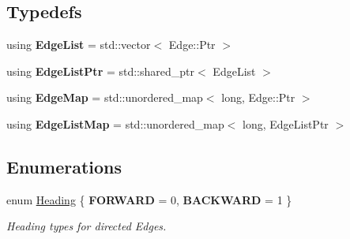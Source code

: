 \subsection*{Typedefs}
\begin{DoxyCompactItemize}
\item 
using {\bfseries Edge\+List} = std\+::vector$<$ Edge\+::\+Ptr $>$\hypertarget{namespacegeo_a4954bc71befa4d36c9f01bc1bdcfa4a9}{}\label{namespacegeo_a4954bc71befa4d36c9f01bc1bdcfa4a9}

\item 
using {\bfseries Edge\+List\+Ptr} = std\+::shared\+\_\+ptr$<$ Edge\+List $>$\hypertarget{namespacegeo_a840e1425ec1f0ce5bee8007cd8d8e31f}{}\label{namespacegeo_a840e1425ec1f0ce5bee8007cd8d8e31f}

\item 
using {\bfseries Edge\+Map} = std\+::unordered\+\_\+map$<$ long, Edge\+::\+Ptr $>$\hypertarget{namespacegeo_ad4965f9d39034484ea50d791836b82de}{}\label{namespacegeo_ad4965f9d39034484ea50d791836b82de}

\item 
using {\bfseries Edge\+List\+Map} = std\+::unordered\+\_\+map$<$ long, Edge\+List\+Ptr $>$\hypertarget{namespacegeo_a591255ebf7af9bc8f60949f87ac435e8}{}\label{namespacegeo_a591255ebf7af9bc8f60949f87ac435e8}

\end{DoxyCompactItemize}
\subsection*{Enumerations}
\begin{DoxyCompactItemize}
\item 
enum \hyperlink{namespacegeo_ae7a495a59f07984a90e0b609bc038df9}{Heading} \{ {\bfseries F\+O\+R\+W\+A\+RD} = 0, 
{\bfseries B\+A\+C\+K\+W\+A\+RD} = 1
 \}\hypertarget{namespacegeo_ae7a495a59f07984a90e0b609bc038df9}{}\label{namespacegeo_ae7a495a59f07984a90e0b609bc038df9}
\begin{DoxyCompactList}\small\item\em Heading types for directed Edges. \end{DoxyCompactList}
\end{DoxyCompactItemize}
